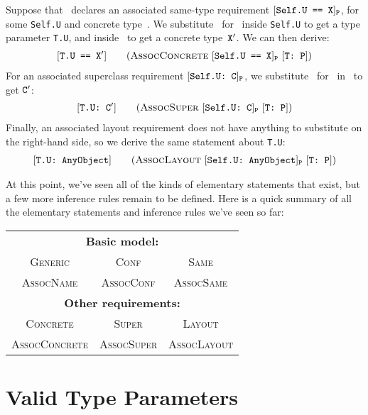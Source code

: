 \documentclass[../generics]{subfiles}
\begin{document}
Suppose that \tP\ declares an associated same-type requirement $[\texttt{Self.U == X}]_{\texttt{P}}$, for some \texttt{Self.U} and concrete type~\tX. We substitute \tT\ for \tSelf\ inside \texttt{Self.U} to get a type parameter \texttt{T.U}, and inside \tX\ to get a concrete type~$\texttt{X}^\prime$. We can then derive:
\begin{gather*}
\AssocConcreteStepDef
\end{gather*}
For an associated superclass requirement $[\texttt{Self.U:~C}]_{\texttt{P}}$, we substitute \tT\ for \tSelf\ in \tC\ to get $\texttt{C}^\prime$:
\begin{gather*}
\AssocSuperStepDef
\end{gather*}
Finally, an associated layout requirement does not have anything to substitute on the right-hand side, so we derive the same statement about \texttt{T.U}:
\begin{gather*}
\AssocLayoutStepDef
\end{gather*}

\pagebreak

At this point, we've seen all of the kinds of elementary statements that exist, but a few more inference rules remain to be defined. Here is a quick summary of all the elementary statements and inference rules we've seen so far:
\begin{center}
\begin{tabular}{ccc}
\toprule
\multicolumn{3}{c}{\textbf{Basic model:}}\\
\textsc{Generic}&\textsc{Conf}&\textsc{Same}\\
\textsc{AssocName}&\textsc{AssocConf}&\textsc{AssocSame}\\
\midrule
\multicolumn{3}{c}{\textbf{Other requirements:}}\\
\textsc{Concrete}&\textsc{Super}&\textsc{Layout}\\
\textsc{AssocConcrete}&\textsc{AssocSuper}&\textsc{AssocLayout}\\
\bottomrule
\end{tabular}
\end{center}

\section{Valid Type Parameters}\label{valid type params}
\end{document}
